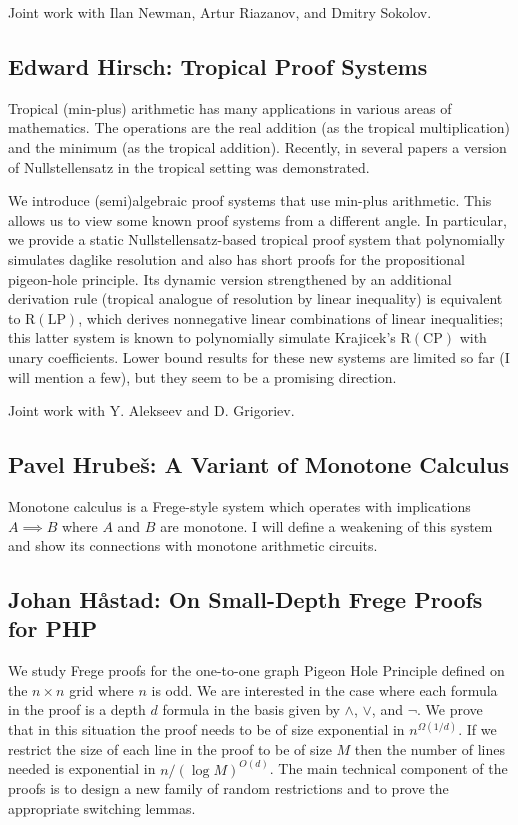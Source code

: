 \documentclass[11pt]{article}
\begin{document}
Joint work with Ilan Newman, Artur Riazanov, and Dmitry Sokolov.



\subsection*{Edward Hirsch: Tropical Proof Systems}\label{Hirsch}

Tropical (min-plus) arithmetic has many applications in various areas of mathematics. The operations are the real addition (as the tropical multiplication) and the minimum (as the tropical addition). Recently, in several papers a version of Nullstellensatz in the tropical setting was demonstrated. 

We introduce (semi)algebraic proof systems that use min-plus arithmetic. This allows us to view some known proof systems from a different angle. In particular, we provide a static Nullstellensatz-based tropical proof system that polynomially simulates daglike resolution and also has short proofs for the propositional pigeon-hole principle. Its dynamic version strengthened by an additional derivation rule (tropical analogue of resolution by linear inequality) is equivalent to $\mathrm{R}(\mathrm{LP})$, which derives nonnegative linear combinations of linear inequalities; this latter system is known to polynomially simulate Krajicek's $\mathrm{R}(\mathrm{CP})$ with unary coefficients. Lower bound results for these new systems are limited so far (I will mention a few), but they seem to be a promising direction.

Joint work with Y. Alekseev and D. Grigoriev.
\subsection*{Pavel Hrube\v{s}: A Variant of Monotone Calculus}\label{Hrubes}

Monotone calculus is a Frege-style system which operates with implications $A\implies B$ where $A$ and $B$ are monotone. I will define a weakening of this system and show its connections with monotone arithmetic circuits.


\subsection*{Johan H\aa stad: On Small-Depth Frege Proofs for PHP}\label{Hastad}

We study Frege proofs for the one-to-one graph Pigeon Hole Principle
defined on the $n\times n$ grid where $n$ is odd.
We are interested in the case where each formula
in the proof is a depth $d$ formula in the basis given by
$\land$, $\lor$, and $\neg$. We prove that in this situation the
proof needs to be of size exponential in $n^{\Omega (1/d)}$.
If we restrict the size of each line in the proof to be of
size $M$ then the number of lines needed is exponential
in $n/(\log M)^{O(d)}$.   The main technical component of
the proofs is to design a new family of random restrictions
and to prove the appropriate switching lemmas.
\end{document}

